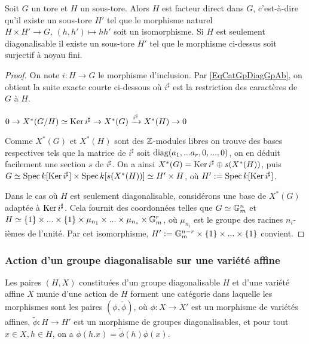 \begin{prop}\label{GDiagSubtorusFacteurDirect}
Soit $G$ un tore et $H$ un sous-tore. Alors $H$ est facteur direct dans $G$, c'est-à-dire qu'il existe un sous-tore $H'$ tel que le morphisme naturel $H\times H'\rightarrow G,\, (h,h')\mapsto hh'$ soit un isomorphisme. Si $H$ est seulement diagonalisable il existe un sous-tore $H'$ tel que le morphisme ci-dessus soit surjectif à noyau fini.
\end{prop}
\begin{proof}
On note $i:H\rightarrow G$ le morphisme d'inclusion. Par \ref{EqCatGpDiagGpAb}, on obtient la suite exacte courte ci-dessous où $i^\sharp$ est la restriction des caractères de $
G$ à $H$.
\begin{center}
$0\rightarrow X^*(G/H)\simeq\operatorname{Ker} i^\sharp\rightarrow X^*(G)\xrightarrow{i^\sharp} X^*(H)\rightarrow 0$
\end{center}
Comme $X^*(G)$ et $X^*(H)$ sont des $\mathbb{Z}$-modules libres on trouve des bases respectives tels que la matrice de $i^\sharp$ soit $\operatorname{diag}(a_1,...a_r,0,...,0)$, on en déduit facilement une section $s$ de $i^\sharp$. On a ainsi $X^*(G)=\operatorname{Ker} i^\sharp\oplus s(X^*(H))$, puis $G\simeq \operatorname{Spec} k[\operatorname{Ker} i^\sharp] \times \operatorname{Spec} k[s(X^*(H))]\simeq H'\times H$, où $H':=\operatorname{Spec} k[\operatorname{Ker} i^\sharp]$.

Dans le cas où $H$ est seulement diagonalisable, considérons une base de $X^*(G)$ adaptée à $\operatorname{Ker} i^\sharp$. Cela fournit des coordonnées telles que $G\simeq \mathbb{G}_m^n$ et $H\simeq \lbrace 1\rbrace\times...\times\lbrace 1\rbrace\times\mu_{n_1}\times...\times\mu_{n_s}\times\mathbb{G}_m^r$, où $\mu_{n_i}$ est le groupe des racines $n_i$-ièmes de l'unité. Par cet isomorphisme, $H':=\mathbb{G}_m^{n-r}\times  \lbrace 1\rbrace\times...\times  \lbrace 1\rbrace$ convient.
\end{proof}

\subsubsection{Action d'un groupe diagonalisable sur une variété affine}

Les paires $(H, X)$ constituées d'un groupe diagonalisable $H$ et d'une variété affine $X$ munie d'une action de $H$ forment une catégorie dans laquelle les morphismes sont les paires $(\phi,\widetilde{\phi})$, où $\phi:X\rightarrow X'$ est un morphisme de variétés affines, $\widetilde{\phi}:H\rightarrow H'$ est un morphisme de groupes diagonalisables, et pour tout $x\in X, h\in H$, on a $\phi(h.x)=\widetilde{\phi}(h)\phi(x)$.

